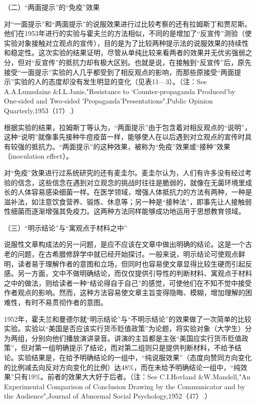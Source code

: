 \documentclass[UTF8,12pt]{ctexart}
\numberwithin{equation}{section} %
\numberwithin{figure}{section}
\numberwithin{table}{section}
\begin{document}
	（二）“两面提示”的“免疫”效果
	
	对“一面提示”和“两面提示”的说服效果进行过比较考察的还有拉姆斯丁和贾尼斯。他们在1953年进行的实验与霍夫兰的方法相似，不同的是增加了“反宣传”测验（使实验对象接触对立观点的宣传），目的是为了比较两种提示法的说服效果的持续性和稳定性。这次实验的结果证明，尽管从单纯比较来看两者的效果并无优劣强弱之分，但对“反宣传”的抵抗力却有极大区别。也就是说，在接触到“反宣传”后，原先接受“一面提示”实验的人几乎都受到了相反观点的影响，而那些原接受“两面提示”实验的人的态度却没有发生明显的变化（见表11—3）。（注：See A.A.Lumsdaine \&I.L.Janis,"Resistance to ‘Counter-propaganda Produced'by One-sided and Two-sided 'Propaganda’Presentations",Public Opinion Quarterly,1953（17）.）
	
	根据实验的结果，拉姆斯丁等认为，“两面提示”由于包含着对相反观点的“说明”，这种“说明”就像事先接种牛痘疫苗一样，能够使人在以后遇到对立观点的宣传时具有较强的抵抗力。“两面提示”的这种效果，被称为“免疫”效果或“接种”效果（inoculation effect）。
	
	对“免疫”效果进行过系统研究的还有麦圭尔。麦圭尔认为，人们有许多没有经过考验的信念，这些信念在遇到对立观念的挑战时往往是脆弱的，就像在无菌环境里成长的人体容易感染细菌一样。在医学领域，增强人体抵抗力的方法有两种，一种是滋补法，如注意饮食营养、锻炼、休息等；另一种是“接种法”，即事先让人接触弱性细菌而逐渐增强其免疫力。这两种方法同样能够成功地运用于思想教育领域。
	
	（三）“明示结论”与“寓观点于材料之中”
	
	说服性文章构成法的另一问题，是应不应该在文章中做出明确的结论。这是一个古老的问题，在古希腊修辞学中就已经开始探讨。一般来说，明示结论可使观点鲜明，读者易于理解作者的意图和立场，但同时也容易使文章显得比较生硬而引起反感。另一方面，文中不做明确结论，而仅仅提供引导性的判断材料、寓观点于材料之中的做法，则给读者一种“结论得自于自己”的感觉，可使他们在不知不觉中接受作者观点的影响。然而，这种方法容易使文章主旨变得隐晦、模糊，增加理解的困难性，有时不易贯彻作者的意图。
	
	1952年，霍夫兰和曼德尔就“明示结论”与“不明示结论”的效果做了一次简单的比较实验。实验以“美国是否应该实行货币贬值政策”为论题，将实验对象（大学生）分为两组，分别向他们播放演讲录音。讲演的主旨都是主张“美国应实行货币贬值政策”，但对第一组明确提示了结论，而对第二组则只是提供判断材料，不给予结论。实验结果是，在给予明确结论的一组中，“纯说服效果”（态度向赞同方向变化的比例减去向反对方向变化的比例）达48\%，而在未给予明确结论一组中，“纯效果”只有19\%。前者的效果大大好于后者。（注：See C.I.Hovland \&W.Mandell,"An Experimental Comparison of Conclusion Drawing by the Communicator and by the Audience",Journal of Abnormal Social Psychology,1952（47）.）
	
\end{document}
